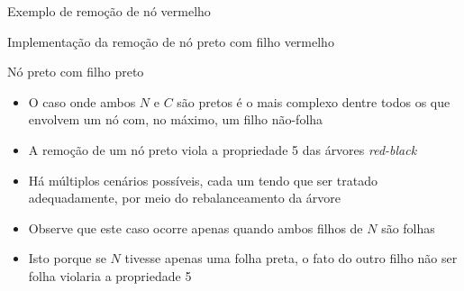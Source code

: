 \begin{frame}[fragile]{Exemplo de remoção de nó vermelho}


\end{frame}

\begin{frame}[fragile]{Implementação da remoção de nó preto com filho vermelho}
\end{frame}

\begin{frame}[fragile]{Nó preto com filho preto}

    \begin{itemize}
        \item O caso onde ambos $N$ e $C$ são pretos é o mais complexo dentre todos os que
            envolvem um nó com, no máximo, um filho não-folha

        \item A remoção de um nó preto viola a propriedade 5 das árvores \textit{red-black}

        \item Há múltiplos cenários possíveis, cada um tendo que ser tratado adequadamente,
            por meio do rebalanceamento da árvore

        \item Observe que este caso ocorre apenas quando ambos filhos de $N$ são folhas

        \item Isto porque se $N$ tivesse apenas uma folha preta, o fato do outro filho não ser
            folha violaria a propriedade 5
    \end{itemize}

\end{frame}

